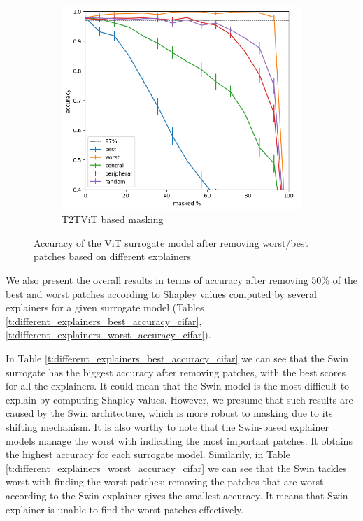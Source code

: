 \documentclass[en]{pracamgr}
\begin{document}
\begin{figure}
\begin{subfigure}{.5\textwidth}
  \centering
  \includegraphics[width=1\linewidth]{./images/v_on_v_metrics.png}
  \caption{T2T\textunderscore ViT based masking }
\end{subfigure}


\caption{Accuracy of the ViT surrogate model after removing worst/best patches based on different explainers}
\label{fig:Different explainers metrics}
\end{figure}



We also present the overall results in terms of accuracy after removing 50\% of the best and worst patches according to Shapley values computed by several explainers for a given surrogate model (Tables \ref{t:different_explainers_best_accuracy_cifar}, \ref{t:different_explainers_worst_accuracy_cifar}).

In Table  \ref{t:different_explainers_best_accuracy_cifar} we can see that the Swin surrogate has the biggest accuracy after removing patches, with the best scores for all the explainers. It could mean that the Swin model is the most difficult to explain by computing Shapley values. However, we presume that such results are caused by the Swin architecture, which is more robust to masking due to its shifting mechanism. It is also worthy to note that the Swin-based explainer models manage the worst with indicating the most important patches. It obtains the highest accuracy for each surrogate model. Similarily, in Table  \ref{t:different_explainers_worst_accuracy_cifar} we can see that the Swin tackles worst with finding the worst patches; removing the patches that are worst according to the Swin explainer gives the smallest accuracy. It means that Swin explainer is unable to find the worst patches effectively.
\end{document}
